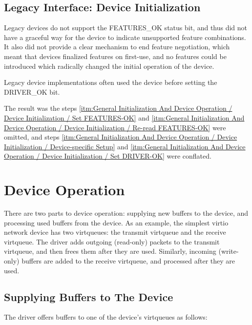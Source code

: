 \subsection{Legacy Interface: Device Initialization}\label{sec:General Initialization And Device Operation / Device Initialization / Legacy Interface: Device Initialization}
Legacy devices do not support the FEATURES_OK status bit, and thus did
not have a graceful way for the device to indicate unsupported feature
combinations.  It also did not provide a clear mechanism to end
feature negotiation, which meant that devices finalized features on
first-use, and no features could be introduced which radically changed
the initial operation of the device.

Legacy device implementations often used the device before setting the
DRIVER_OK bit.

The result was the steps \ref{itm:General Initialization And Device Operation / Device Initialization / Set FEATURES-OK} and \ref{itm:General Initialization And Device Operation / Device Initialization / Re-read FEATURES-OK} were omitted, and steps \ref{itm:General Initialization And Device Operation / Device Initialization / Device-specific Setup} and \ref{itm:General Initialization And Device Operation / Device Initialization / Set DRIVER-OK}
were conflated.

\section{Device Operation}\label{sec:General Initialization And Device Operation / Device Operation}

There are two parts to device operation: supplying new buffers to
the device, and processing used buffers from the device. As an
example, the simplest virtio network device has two virtqueues: the
transmit virtqueue and the receive virtqueue. The driver adds
outgoing (read-only) packets to the transmit virtqueue, and then
frees them after they are used. Similarly, incoming (write-only)
buffers are added to the receive virtqueue, and processed after
they are used.

\subsection{Supplying Buffers to The Device}\label{sec:General Initialization And Device Operation / Device Operation / Supplying Buffers to The Device}

The driver offers buffers to one of the device's virtqueues as follows:

